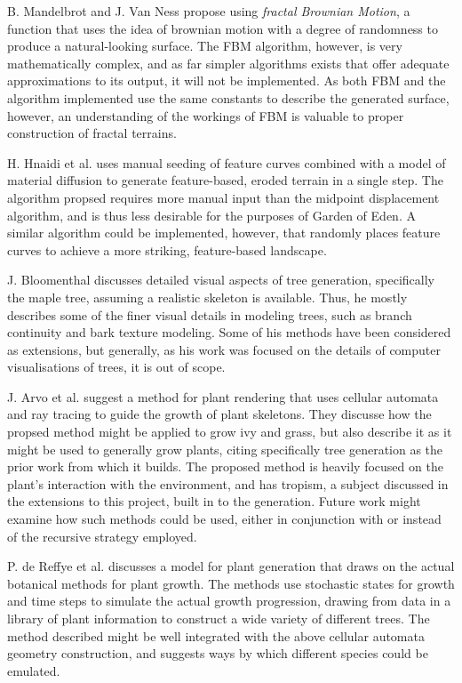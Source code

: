 \documentclass{article}
\newcommand{\tab}{\hspace*{2em}}
\begin{document}
    \tab B. Mandelbrot and J. Van Ness\cite{mandelbrot68} propose using \emph{fractal Brownian Motion}, a
function that uses the idea of brownian motion with a degree of randomness
to produce a natural-looking surface. The FBM algorithm, however, is very mathematically complex, and
as far simpler algorithms exists that offer adequate approximations to its output, it will not be
implemented. As both FBM and the algorithm implemented use the same constants to describe the
generated surface, however, an understanding of the workings of FBM is valuable to proper
construction of fractal terrains.

    \tab H. Hnaidi et al.\cite{hnaidi10} uses manual seeding of feature curves combined with
a model of material diffusion to generate feature-based, eroded terrain in a single step. The algorithm
propsed requires more manual input than the midpoint displacement algorithm, and is thus less
desirable for the purposes of Garden of Eden. A similar algorithm could be implemented, however,
that randomly places feature curves to achieve a more striking, feature-based landscape.

    \tab J. Bloomenthal\cite{bloomenthal85} discusses detailed visual aspects of tree
generation, specifically the maple tree, assuming a realistic skeleton is available. Thus, he
mostly describes some of the finer visual details in modeling trees, such as branch continuity and
bark texture modeling. Some of his methods have been considered as extensions, but generally, as
his work was focused on the details of computer visualisations of trees, it is out of scope.

    \tab J. Arvo et al. suggest a method for plant rendering that uses cellular automata and ray tracing
to guide the growth of plant skeletons\cite{arvo88}. They discusse how the propsed method
might be applied to grow ivy and grass, but also describe it as it might be used to generally grow
plants, citing specifically tree generation as the prior work from which it builds. The proposed
method is heavily focused on the plant's interaction with the environment, and has tropism,
a subject discussed in the extensions to this project, built in to the generation. Future work
might examine how such methods could be used, either in conjunction with or instead of the
recursive strategy employed.

   \tab P. de Reffye et al. discusses a model for plant generation that draws on the actual botanical 
methods for plant growth\cite{dereffye88}. The methods use stochastic states for growth and time
steps to simulate the actual growth progression, drawing from data in a library of plant
information to construct a wide variety of different trees. The method described might be well
integrated with the above cellular automata geometry construction, and suggests ways by which
different species could be emulated.
\end{document}
